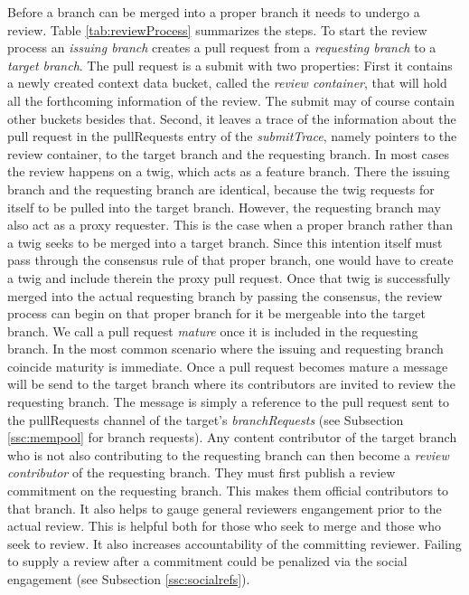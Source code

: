 Before a branch can be merged into a proper branch it needs to undergo a review. Table \ref{tab:reviewProcess} summarizes the steps.
To start the review process an \textit{issuing branch} creates a pull request from a \textit{requesting branch} to a \textit{target branch}. The pull request is a submit with two properties: First it contains a newly created context data bucket, called the \textit{review container}, that will hold all the forthcoming information of the review. The submit may of course contain other buckets besides that. Second, it leaves a trace of the information about the pull request in the pullRequests entry of the \textit{submitTrace}, namely pointers to the review container, to the target branch and the requesting branch. In most cases the review happens on a twig, which acts as a feature branch. There the issuing branch and the requesting branch are identical, because the twig requests for itself to be pulled into the target branch. However, the requesting branch may also act as a proxy requester. This is the case when a proper branch rather than a twig seeks to be merged into a target branch. Since this intention itself must pass through the consensus rule of that proper branch, one would have to create a twig and include therein the proxy pull request. Once that twig is successfully merged into the actual requesting branch by passing the consensus, the review process can begin on that proper branch for it be mergeable into the target branch. We call a pull request \textit{mature} once it is included in the requesting branch. In the most common scenario where the issuing and requesting branch coincide maturity is immediate. 
Once a pull request becomes mature a message will be send to the target branch  where its contributors are invited to review the requesting branch. The message is simply a reference to the pull request sent to the pullRequests channel of the target's \textit{branchRequests} (see Subsection \ref{ssc:mempool} for branch requests).
Any content contributor of the target branch who is not also contributing to the requesting branch can then become a \textit{review contributor} of the requesting branch. They must first publish a review commitment on the requesting branch. This makes them official contributors to that branch. It also helps to gauge general reviewers engangement prior to the actual review. This is helpful both for those who seek to merge and those who seek to review. It also increases accountability of the committing reviewer. Failing to supply a review after a commitment could be penalized via the social engagement (see Subsection \ref{ssc:socialrefs}).  
